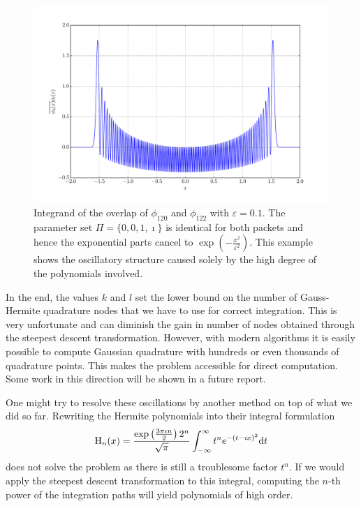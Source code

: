 \documentclass[a4paper,10pt]{article}
\begin{document}
\begin{figure}[h!]
  \centering
  \includegraphics[width=0.8\linewidth]{./fig/poly_oscillations.pdf}
  \caption{Integrand of the overlap of $\phi_{120}$ and $\phi_{122}$
  with $\varepsilon=0.1$. The parameter set $\Pi = \{0,0,1,\imath\}$
  is identical for both packets and hence the exponential parts cancel
  to $\exp(-\frac{x^2}{\varepsilon^2})$. This example shows the oscillatory
  structure caused solely by the high degree of the polynomials involved.}
  \label{fig:polynomials_oscillations}
\end{figure}

In the end, the values $k$ and $l$ set the lower bound on the number of Gauss-Hermite
quadrature nodes that we have to use for correct integration. This is very unfortunate
and can diminish the gain in number of nodes obtained through the steepest descent
transformation. However, with modern algorithms it is easily possible to compute
Gaussian quadrature with hundreds or even thousands of quadrature points. This
makes the problem accessible for direct computation. Some work
in this direction will be shown in a future report.


One might try to resolve these oscillations by another method on top
of what we did so far. Rewriting the Hermite polynomials into their integral formulation
\begin{equation*}
  \operatorname{H}_n(x) =
  \frac{\exp\left(\frac{3\pi \imath n}{2}\right) 2^n}{\sqrt{\pi}}
  \int_{-\infty}^{\infty} t^n e^{-(t - \imath x)^2} \mathrm{d}t
\end{equation*}
does not solve the problem as there is still a troublesome factor $t^n$.
If we would apply the steepest descent transformation to this integral, computing
the $n$-th power of the integration paths will yield polynomials of high order.
\end{document}
